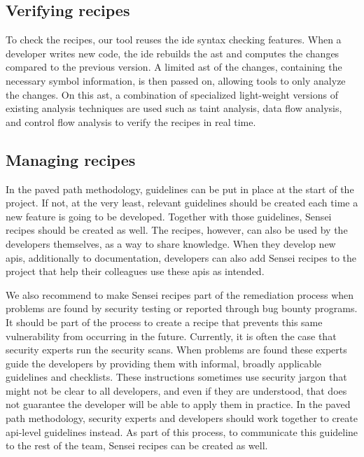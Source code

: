 \subsection{Verifying recipes}
To check the recipes, our tool reuses the \gls{ide} syntax checking features.
When a developer writes new code, the \gls{ide} rebuilds the \gls{ast} and computes the changes compared to the previous version.
A limited \gls{ast} of the changes, containing the necessary symbol information, is then passed on, allowing tools to only analyze the changes.
On this \gls{ast}, a combination of specialized light-weight versions of existing analysis techniques are used such as taint analysis, data flow analysis, and control flow analysis to verify the recipes in real time.

\subsection{Managing recipes}
\label{sec:manager}
In the paved path methodology, guidelines can be put in place at the start of the project.
If not, at the very least, relevant guidelines should be created each time a new feature is going to be developed.
Together with those guidelines, Sensei recipes should be created as well.
The recipes, however, can also be used by the developers themselves, as a way to share knowledge.
When they develop new \glspl{api}, additionally to documentation, developers can also add Sensei recipes to the project that help their colleagues use these \glspl{api} as intended.

We also recommend to make Sensei recipes part of the remediation process when problems are found by security testing or reported through bug bounty programs.
It should be part of the process to create a recipe that prevents this same vulnerability from occurring in the future.
Currently, it is often the case that security experts run the security scans.
When problems are found these experts guide the developers by providing them with informal, broadly applicable guidelines and checklists.
These instructions sometimes use security jargon that might not be clear to all developers, and even if they are understood, that does not guarantee the developer will be able to apply them in practice.
In the paved path methodology, security experts and developers should work together to create \gls{api}-level guidelines instead.
As part of this process, to communicate this guideline to the rest of the team, Sensei recipes can be created as well.

